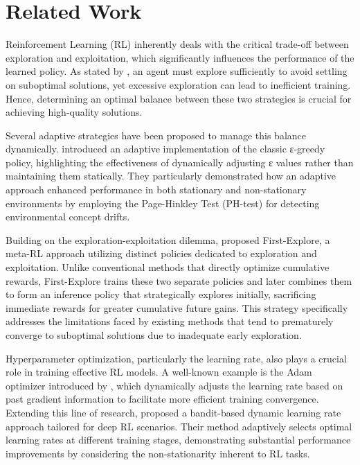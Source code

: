 
\section{Related Work}
\label{sec:related}

Reinforcement Learning (RL) inherently deals with the critical trade-off between exploration and exploitation, which significantly influences the performance of the learned policy. As stated by \citet{sutton98}, an agent must explore sufficiently to avoid settling on suboptimal solutions, yet excessive exploration can lead to inefficient training. Hence, determining an optimal balance between these two strategies is crucial for achieving high-quality solutions.

Several adaptive strategies have been proposed to manage this balance dynamically. \citet{mignon2017adaptive} introduced an adaptive implementation of the classic ε-greedy policy, highlighting the effectiveness of dynamically adjusting ε values rather than maintaining them statically. They particularly demonstrated how an adaptive approach enhanced performance in both stationary and non-stationary environments by employing the Page-Hinkley Test (PH-test) for detecting environmental concept drifts.

Building on the exploration-exploitation dilemma, \citet{norman2024firstexploreexploitmetalearningsolve} proposed First-Explore, a meta-RL approach utilizing distinct policies dedicated to exploration and exploitation. Unlike conventional methods that directly optimize cumulative rewards, First-Explore trains these two separate policies and later combines them to form an inference policy that strategically explores initially, sacrificing immediate rewards for greater cumulative future gains. This strategy specifically addresses the limitations faced by existing methods that tend to prematurely converge to suboptimal solutions due to inadequate early exploration.

Hyperparameter optimization, particularly the learning rate, also plays a crucial role in training effective RL models. A well-known example is the Adam optimizer introduced by \citet{kingma2017adammethodstochasticoptimization}, which dynamically adjusts the learning rate based on past gradient information to facilitate more efficient training convergence. Extending this line of research, \citet{dynamicrlalpha} proposed a bandit-based dynamic learning rate approach tailored for deep RL scenarios. Their method adaptively selects optimal learning rates at different training stages, demonstrating substantial performance improvements by considering the non-stationarity inherent to RL tasks.

